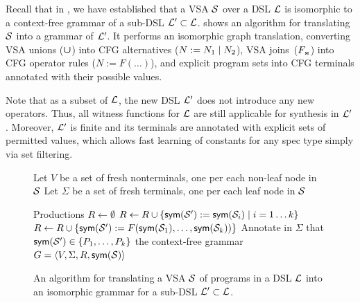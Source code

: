 Recall that in , we have established that a VSA $\mathcal{S}$ over a DSL $\mathcal{L}$ is isomorphic to a
context-free grammar of a sub-DSL $\mathcal{L}' \subset \mathcal{L}$.
 shows an algorithm for translating $\mathcal{S}$ into a grammar of $\mathcal{L}'$.
It performs an isomorphic graph translation, converting VSA unions ($\bm{\mathsf{\cup}}$) into CFG alternatives ($N := N_1 \;|\;
N_2$), VSA joins~($F_{\text{\tiny\ensuremath{\Join}}}$) into CFG operator rules ($N := F(\dots)$), and explicit program sets into CFG terminals
annotated with their possible values.

Note that as a subset of $\mathcal{L}$, the new DSL $\mathcal{L}'$ does not introduce any new operators.
Thus, all witness functions for $\mathcal{L}$ are still applicable for synthesis in $\mathcal{L}'$.
Moreover, $\mathcal{L}'$ is finite and its terminals are annotated with explicit sets of permitted values, which allows fast learning of constants
for any spec type simply via set filtering.

\begin{figure}[t]
    \centering
    \small
    \begin{algorithmic}[1]
            \State Let $V$ be a set of fresh nonterminals, one per each non-leaf node in $\mathcal{S}$
            \State Let $\Sigma$ be a set of fresh terminals, one per each leaf node in $\mathcal{S}$
            \State {}
            \addtocounter{ALG@line}{-1}
            \WithNumber \State Productions $R \gets \emptyset$
            \State {}
                \State $R \gets R \cup \{ \mathsf{sym}(\mathcal{S}') := \mathsf{sym}(\mathcal{S}_i) \mid i = 1 \dots k \}$
            \EndFor
            \State {}
                \State $R \gets R \cup \{ \mathsf{sym}(\mathcal{S}') := F(\mathsf{sym}(\mathcal{S}_1), \dots, \mathsf{sym}(\mathcal{S}_k)) \}$
            \EndFor
            \State {}
                \State Annotate in $\Sigma$ that $\mathsf{sym}(\mathcal{S}') \in \{ P_1, \dots, P_k \}$
            \EndFor
            \State \Return the context-free grammar $G = \langle V, \Sigma, R, \mathsf{sym}(\mathcal{S})\rangle$
        \EndFunction
    \end{algorithmic}
    \uwsinglespace
    \vspace*{\baselineskip}
    \caption{An algorithm for translating a VSA $\mathcal{S}$ of programs in a DSL $\mathcal{L}$ into an isomorphic grammar for a
        sub-DSL $\mathcal{L}' \subset \mathcal{L}$.}
    \label{fig:vsa:incremental}
\end{figure}

